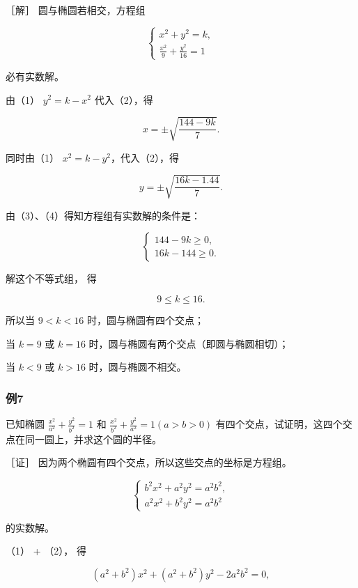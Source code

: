 ［解］ 圆与椭圆若相交，方程组

\[
\left\{ \begin{array}{l} x^{2} + y^{2} = k, \\ \frac {x^{2}}{9} + \frac {y^{2}}{16} = 1 \end{array} \right. \tag {1}
\]

必有实数解。

由（1） \(y^{2}=k-x^{2}\) 代入（2），得

\[
x = \pm \sqrt {\frac {144 - 9 k}{7}}. \tag {3}
\]

同时由（1） \(x^{2}=k-y^{2}\)，代入（2），得

\[
y = \pm \sqrt {\frac {16 k - 1. 44}{7}}. \tag {4}
\]

由（3）、（4）得知方程组有实数解的条件是：

\[
\left\{ \begin{array}{l} 144 - 9 k \geqslant 0, \\ 16 k - 144 \geqslant 0. \end{array} \right.
\]

解这个不等式组， 得

\[
9 \leqslant k \leqslant 16.
\]

所以当 \(9 < k < 16\) 时，圆与椭圆有四个交点；

当 \(k = 9\) 或 \(k = 16\) 时，圆与椭圆有两个交点（即圆与椭圆相切）；

当 \(k < 9\) 或 \(k > 16\) 时，圆与椭圆不相交。

\subsubsection{例7}\label{ux4f8b7-2}

已知椭圆 \(\frac{x^2}{a^2} + \frac{y^2}{b^2} = 1\) 和
\(\frac{x^2}{b^2} + \frac{y^2}{a^2} = 1 (a > b > 0)\)
有四个交点，试证明，这四个交点在同一圆上，并求这个圆的半径。

［证］ 因为两个椭圆有四个交点，所以这些交点的坐标是方程组。

\[
\left\{ \begin{array}{l} b^{2} x^{2} + a^{2} y^{2} = a^{2} b^{2}, \\ a^{2} x^{2} + b^{2} y^{2} = a^{2} b^{2} \end{array} \right. \tag {1}
\]

的实数解。

（1） + （2）， 得

\[
\left(a^{2} + b^{2}\right) x^{2} + \left(a^{2} + b^{2}\right) y^{2} - 2 a^{2} b^{2} = 0, \tag {3}
\]

